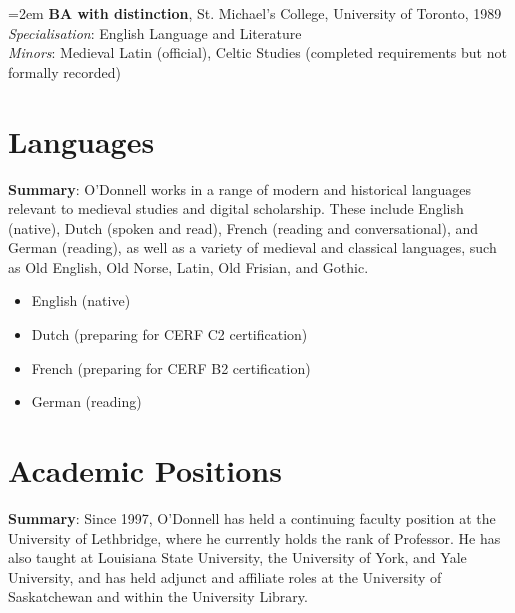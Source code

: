 \documentclass[12pt]{article}
\begin{document}
\vspace{0.5em}
\hangindent=2em
\textbf{BA with distinction}, St. Michael’s College, University of Toronto, 1989\\
\textit{Specialisation}: English Language and Literature\\
\textit{Minors}: Medieval Latin (official), Celtic Studies (completed requirements but not formally recorded)

\section*{Languages}

\textbf{Summary}: O'Donnell works in a range of modern and historical languages relevant to medieval studies and digital scholarship. These include English (native), Dutch (spoken and read), French (reading and conversational), and German (reading), as well as a variety of medieval and classical languages, such as Old English, Old Norse, Latin, Old Frisian, and Gothic.

\begin{itemize}
  \item English (native)
  \item Dutch (preparing for CERF C2 certification)
  \item French (preparing for CERF B2 certification)
  \item German (reading)
\end{itemize}


\section*{Academic Positions}

\textbf{Summary}: Since 1997, O'Donnell has held a continuing faculty position at the University of Lethbridge, where he currently holds the rank of Professor. He has also taught at Louisiana State University, the University of York, and Yale University, and has held adjunct and affiliate roles at the University of Saskatchewan and within the University Library.
\end{document}
